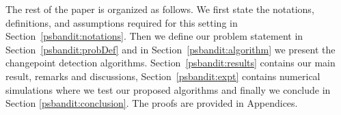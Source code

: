 
    
    The rest of the paper is organized as follows. We first state the notations, definitions, and assumptions required for this setting in Section~\ref{psbandit:notations}. Then we define our problem statement in Section~\ref{psbandit:probDef} and in Section~\ref{psbandit:algorithm} we present the changepoint detection algorithms. Section~\ref{psbandit:results} contains our main result, remarks and discussions, Section~\ref{psbandit:expt} contains numerical simulations where we test our proposed algorithms and finally we conclude in Section \ref{psbandit:conclusion}. The proofs are provided in Appendices.
    
